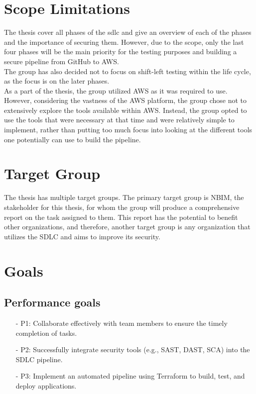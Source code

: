  
\section{Scope Limitations}
The thesis cover all phases of the \acrlong{sdlc} and give an overview of each of the phases and the importance of securing them. However, due to the scope, only the last four phases will be the main priority for the testing purposes and building a secure pipeline from GitHub to AWS.
\\
The group has also decided not to focus on \gls{shift-left} testing within the life cycle, as the focus is on the later phases. 
\\
As a part of the thesis, the group utilized AWS as it was required to use. However, considering the vastness of the AWS platform, the group chose not to extensively explore the tools available within AWS. Instead, the group opted to use the tools that were necessary at that time and were relatively simple to implement, rather than putting too much focus into looking at the different tools one potentially can use to build the pipeline.

\section{Target Group}
The thesis has multiple target groups. The primary target group is NBIM, the stakeholder for this thesis, for whom the group will produce a comprehensive report on the task assigned to them. This report has the potential to benefit other organizations, and therefore, another target group is any organization that utilizes the SDLC and aims to improve its security.
\newpage
\section{Goals}
\subsection{Performance goals}
\begin{itemize}
    \item[-] P1: Collaborate effectively with team members to ensure the timely completion of tasks. 
    
    \item[-] P2: Successfully integrate security tools (e.g., SAST, DAST, SCA) into the SDLC pipeline. 
    
    \item[-] P3: Implement an automated pipeline using Terraform to build, test, and deploy applications.
\end{itemize}

